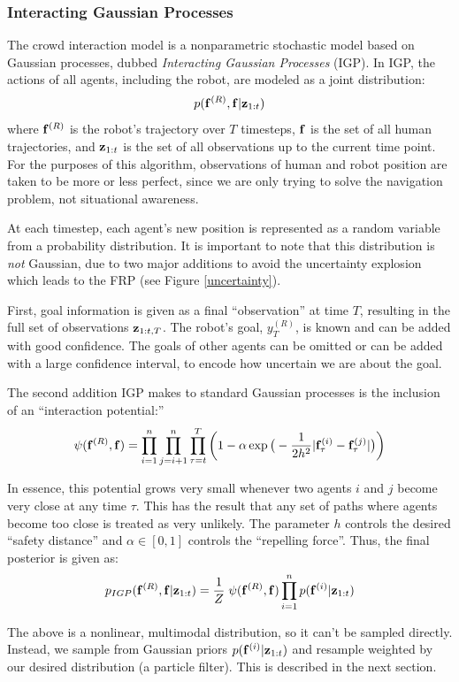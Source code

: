 \documentclass[a4paper,11pt,headings=small]{article}
\begin{document}
\subsubsection*{Interacting Gaussian Processes}
\quad The crowd interaction model is a nonparametric stochastic model based on Gaussian processes, dubbed \emph{Interacting Gaussian Processes} (IGP). In IGP, the actions of all agents, including the robot, are modeled as a joint distribution:
$$p(\mathbf{f}^{(R)},\mathbf{f}|\mathbf{z}_{1:t})$$
where $\mathbf{f}^{(R)}$ is the robot's trajectory over $T$ timesteps, $\mathbf{f}$ is the set of all human trajectories, and $\mathbf{z}_{1:t}$ is the set of all observations up to the current time point. For the purposes of this algorithm, observations of human and robot position are taken to be more or less perfect, since we are only trying to solve the navigation problem, not situational awareness.

At each timestep, each agent's new position is represented as a random variable from a probability distribution. It is important to note that this distribution is \emph{not} Gaussian, due to two major additions to avoid the uncertainty explosion which leads to the FRP (see Figure \ref{uncertainty}).

First, goal information is given as a final ``observation'' at time $T$, resulting in the full set of observations $\mathbf{z}_{1:t,T}$. The robot's goal, $y_T^{(R)}$, is known and can be added with good confidence. The goals of other agents can be omitted or can be added with a large confidence interval, to encode how uncertain we are about the goal.

The second addition IGP makes to standard Gaussian processes is the inclusion of an ``interaction potential:''
$$ \psi(\mathbf{f}^{(R)},\mathbf{f}) = \prod_{i=1}^n \prod_{j=i+1}^n \prod_{\tau=t}^T \left( 1 - \alpha \exp\big(-\frac{1}{2h^2}|\mathbf{f}^{(i)}_{\tau} - \mathbf{f}^{(j)}_{\tau}|\big) \right)$$

In essence, this potential grows very small whenever two agents $i$ and $j$ become very close at any time $\tau$. This has the result that any set of paths where agents become too close is treated as very unlikely. The parameter $h$ controls the desired ``safety distance'' and $\alpha \in [0, 1]$ controls the ``repelling force''. Thus, the final posterior is given as:
$$ p_{IGP}(\mathbf{f}^{(R)},\mathbf{f} | \mathbf{z}_{1:t}) = \frac{1}{Z} \; \psi(\mathbf{f}^{(R)},\mathbf{f}) \prod_{i=1}^n p(\mathbf{f}^{(i)} | \mathbf{z}_{1:t}) $$


The above is a nonlinear, multimodal distribution, so it can't be sampled directly. Instead, we sample from Gaussian priors $p(\mathbf{f}^{(i)}|\mathbf{z}_{1:t})$ and resample weighted by our desired distribution (a particle filter). This is described in the next section.
\end{document}
